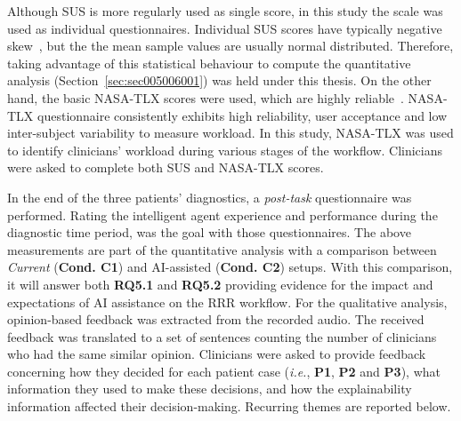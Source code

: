 


Although \ac{SUS} is more regularly used as single score, in this study the scale was used as individual questionnaires.
Individual \ac{SUS} scores have typically negative skew~\cite{lewis2018system}, but the the mean sample values are usually normal distributed.
Therefore, taking advantage of this statistical behaviour to compute the quantitative analysis (Section~\ref{sec:sec005006001}) was held under this thesis.
On the other hand, the basic \ac{NASA-TLX} scores were used, which are highly reliable~\cite{ramkumar2017using}.
\ac{NASA-TLX} questionnaire consistently exhibits high reliability, user acceptance and low inter-subject variability to measure workload.
In this study, \ac{NASA-TLX} was used to identify clinicians' workload during various stages of the workflow.
Clinicians were asked to complete both \ac{SUS} and \ac{NASA-TLX} scores.

In the end of the three patients' diagnostics, a {\it post-task} questionnaire was performed.
Rating the intelligent agent experience and performance during the diagnostic time period, was the goal with those questionnaires.
The above measurements are part of the quantitative analysis with a comparison between {\it Current} ({\bf Cond. C1}) and \ac{AI}-assisted ({\bf Cond. C2}) setups.
With this comparison, it will answer both {\bf RQ5.1} and {\bf RQ5.2} providing evidence for the impact and expectations of \ac{AI} assistance on the \ac{RRR} workflow.
For the qualitative analysis, opinion-based feedback was extracted from the recorded audio.
The received feedback was translated to a set of sentences counting the number of clinicians who had the same similar opinion.
Clinicians were asked to provide feedback concerning how they decided for each patient case ({\it i.e.}, {\bf P1}, {\bf P2} and {\bf P3}), what information they used to make these decisions, and how the explainability information affected their decision-making.
Recurring themes are reported below.


